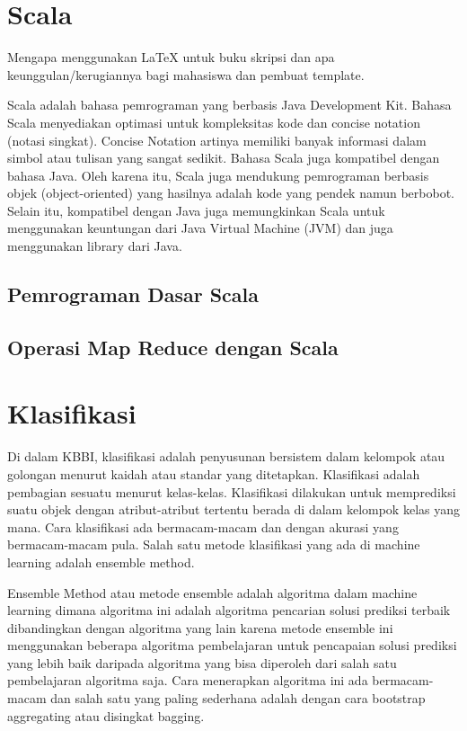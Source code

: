 \section{Scala}
\label{sec:scala}

Mengapa menggunakan \LaTeX{} untuk buku skripsi dan apa keunggulan/kerugiannya bagi mahasiswa dan pembuat template. 

Scala adalah bahasa pemrograman yang berbasis Java Development Kit. Bahasa Scala menyediakan optimasi untuk kompleksitas kode dan concise notation (notasi singkat). Concise Notation artinya memiliki banyak informasi dalam simbol atau tulisan yang sangat sedikit. Bahasa Scala juga kompatibel dengan bahasa Java. Oleh karena itu, Scala juga mendukung pemrograman berbasis objek (object-oriented) yang hasilnya adalah kode yang pendek namun berbobot. Selain itu, kompatibel dengan Java juga memungkinkan Scala untuk menggunakan keuntungan dari Java Virtual Machine (JVM) dan juga menggunakan library dari Java.
\subsection{Pemrograman Dasar Scala}

\subsection{Operasi Map Reduce dengan Scala}


\section{Klasifikasi}
\label{sec:klasifikasi}
Di dalam KBBI, klasifikasi adalah penyusunan bersistem dalam kelompok atau golongan menurut kaidah atau standar yang ditetapkan. Klasifikasi adalah pembagian sesuatu menurut kelas-kelas. Klasifikasi dilakukan untuk memprediksi suatu objek dengan atribut-atribut tertentu berada di dalam kelompok kelas yang mana. Cara klasifikasi ada bermacam-macam dan dengan akurasi yang bermacam-macam pula. Salah satu metode klasifikasi yang ada di machine learning adalah ensemble method.

Ensemble Method atau metode ensemble adalah algoritma dalam machine learning dimana algoritma ini adalah algoritma pencarian solusi prediksi terbaik dibandingkan dengan algoritma yang lain karena metode ensemble ini menggunakan beberapa algoritma pembelajaran untuk pencapaian solusi prediksi yang lebih baik daripada algoritma yang bisa diperoleh dari salah satu pembelajaran algoritma saja. Cara menerapkan algoritma ini ada bermacam-macam dan salah satu yang paling sederhana adalah dengan cara bootstrap aggregating atau disingkat bagging.

